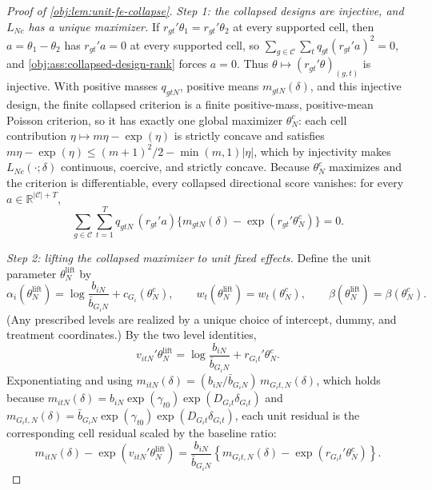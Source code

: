 \begin{proof}[Proof of \cref{obj:lem:unit-fe-collapse}]
\textit{Step 1: the collapsed designs are injective, and \(L_{Nc}\) has a unique maximizer.} If \(r_{gt}'\theta_1=r_{gt}'\theta_2\) at every supported cell, then \(a=\theta_1-\theta_2\) has \(r_{gt}'a=0\) at every supported cell, so \(\sum_{g\in\mathcal C}\sum_t q_{gt}(r_{gt}'a)^2=0\), and \cref{obj:ass:collapsed-design-rank} forces \(a=0\). Thus \(\theta\mapsto(r_{gt}'\theta)_{(g,t)}\) is injective.
With positive masses \(q_{gtN}\), positive means \(m_{gtN}(\delta)\), and this injective design, the finite collapsed criterion is a finite positive-mass, positive-mean Poisson criterion, so it has exactly one global maximizer \(\theta_N^c\): each cell contribution \(\eta\mapsto m\eta-\exp(\eta)\) is strictly concave and satisfies \(m\eta-\exp(\eta)\le (m+1)^2/2-\min(m,1)|\eta|\), which by injectivity makes \(L_{Nc}(\cdot;\delta)\) continuous, coercive, and strictly concave.
Because \(\theta_N^c\) maximizes and the criterion is differentiable, every collapsed directional score vanishes: for every \(a\in\mathbb R^{|\mathcal C|+T}\),
\[
\sum_{g\in\mathcal C}\sum_{t=1}^T
q_{gtN}\,(r_{gt}'a)\{m_{gtN}(\delta)-\exp(r_{gt}'\theta_N^c)\}=0 .
\]

\textit{Step 2: lifting the collapsed maximizer to unit fixed effects.} Define the unit parameter \(\theta_N^{\text{lift}}\) by
\[
\alpha_i(\theta_N^{\text{lift}})
=
\log\frac{b_{iN}}{\bar b_{G_iN}}+c_{G_i}(\theta_N^c),
\qquad
w_t(\theta_N^{\text{lift}})=w_t(\theta_N^c),
\qquad
\beta(\theta_N^{\text{lift}})=\beta(\theta_N^c).
\]
(Any prescribed levels are realized by a unique choice of intercept, dummy, and treatment coordinates.) By the two level identities,
\[
v_{itN}'\theta_N^{\text{lift}}
=
\log\frac{b_{iN}}{\bar b_{G_iN}}+r_{G_it}'\theta_N^c .
\]
Exponentiating and using \(m_{itN}(\delta)=(b_{iN}/\bar b_{G_iN})\,m_{G_it,N}(\delta)\), which holds because \(m_{itN}(\delta)=b_{iN}\exp(\gamma_{t0})\exp(D_{G_it}\delta_{G_it})\) and \(m_{G_it,N}(\delta)=\bar b_{G_iN}\exp(\gamma_{t0})\exp(D_{G_it}\delta_{G_it})\), each unit residual is the corresponding cell residual scaled by the baseline ratio:
\[
m_{itN}(\delta)-\exp(v_{itN}'\theta_N^{\text{lift}})
=
\frac{b_{iN}}{\bar b_{G_iN}}
\left\{m_{G_it,N}(\delta)-\exp(r_{G_it}'\theta_N^c)\right\}.
\]


\end{proof}
